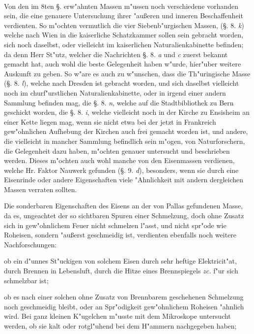 \documentclass[a4paper, 11pt, oneside, polutonikogreek, german]{article}
\begin{document}
\paragraph{}
Von den im 8ten §. erw"ahnten Massen m"ussen noch verschiedene vorhanden sein, die eine genauere Untersuchung ihrer "außeren und inneren Beschaffenheit verdienten. So m"ochten vermutlich die vier Siebenb"urgischen Massen, (§. 8. \emph{k}) welche nach Wien in die kaiserliche Schatzkammer sollen sein gebracht worden, sich noch daselbst, oder vielleicht im kaiserlichen Naturalienkabinette befinden; da denn Herr St"utz, welcher die Nachrichten §. 8. \emph{a} und \emph{c} zuerst bekannt gemacht hat, auch wohl die beste Gelegenheit haben w"urde, hier"uber weitere Auskunft zu geben. So w"are es auch zu w"unschen, dass die Th"uringische Masse (§. 8. \emph{l}), welche nach Dresden ist gebracht worden, und sich daselbst vielleicht noch im churf"urstlichen Naturalienkabinette, oder in irgend einer andern Sammlung befinden mag, die §. 8. \emph{n}, welche auf die Stadtbibliothek zu Bern geschickt worden, die §. 8. \emph{i}, welche vielleicht noch in der Kirche zu Ensisheim an einer Kette liegen mag, wenn sie nicht etwa bei der jetzt in Frankreich gew"ohnlichen Aufhebung der Kirchen auch frei gemacht worden ist, und andere, die vielleicht in mancher Sammlung befindlich sein m"ogen, von Naturforschern, die Gelegenheit dazu haben, m"ochten genauer untersucht und beschrieben werden. Dieses m"ochten auch wohl manche von den Eisenmassen verdienen, welche Hr. Faktor Nauwerk gefunden (§. 9. \emph{d}), besonders, wenn sie durch eine Eisenrinde oder andere Eigenschaften viele "Ahnlichkeit mit andern dergleichen Massen verraten sollten.

Die sonderbaren Eigenschaften des Eisens an der von Pallas gefundenen Masse, da es, ungeachtet der so sichtbaren Spuren einer Schmelzung, doch ohne Zusatz sich in gew"ohnlichem Feuer nicht schmelzen l"asst, und nicht spr"ode wie Roheisen, sondern "außerst geschmeidig ist, verdienten ebenfalls noch weitere Nachforschungen:

ob ein d"unnes St"uckigen von solchem Eisen durch sehr heftige Elektricit"at, durch Brennen in Lebensluft, durch die Hitze eines Brennspiegels \emph{zc.} f"ur sich schmelzbar ist;

ob es nach einer solchen ohne Zusatz von Brennbarem geschehenen Schmelzung noch geschmeidig bleibt, oder an Spr"odigkeit gew"ohnlichem Roheisen "ahnlich wird. Bei ganz kleinen K"ugelchen m"usste mit dem Mikroskope untersucht werden, ob sie kalt oder rotgl"uhend bei dem H"ammern nachgegeben haben;
\end{document}
